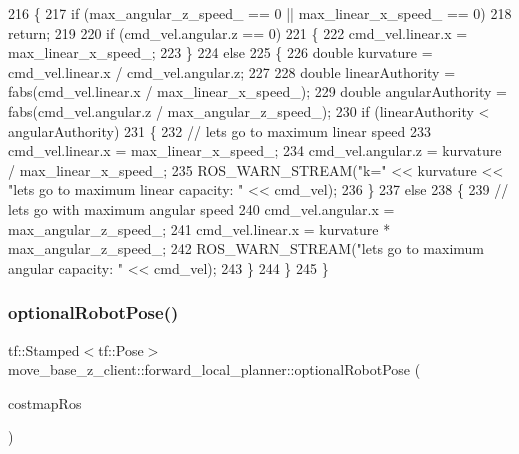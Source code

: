 \begin{DoxyCode}
216 \{
217     \textcolor{keywordflow}{if} (max\_angular\_z\_speed\_ == 0 || max\_linear\_x\_speed\_ == 0)
218         \textcolor{keywordflow}{return};
219 
220     \textcolor{keywordflow}{if} (cmd\_vel.angular.z == 0)
221     \{
222         cmd\_vel.linear.x = max\_linear\_x\_speed\_;
223     \}
224     \textcolor{keywordflow}{else}
225     \{
226         \textcolor{keywordtype}{double} kurvature = cmd\_vel.linear.x / cmd\_vel.angular.z;
227 
228         \textcolor{keywordtype}{double} linearAuthority = fabs(cmd\_vel.linear.x / max\_linear\_x\_speed\_);
229         \textcolor{keywordtype}{double} angularAuthority = fabs(cmd\_vel.angular.z / max\_angular\_z\_speed\_);
230         \textcolor{keywordflow}{if} (linearAuthority < angularAuthority)
231         \{
232             \textcolor{comment}{// lets go to maximum linear speed}
233             cmd\_vel.linear.x = max\_linear\_x\_speed\_;
234             cmd\_vel.angular.z = kurvature / max\_linear\_x\_speed\_;
235             ROS\_WARN\_STREAM(\textcolor{stringliteral}{"k="} << kurvature << \textcolor{stringliteral}{"lets go to maximum linear capacity: "} << cmd\_vel);
236         \}
237         \textcolor{keywordflow}{else}
238         \{
239             \textcolor{comment}{// lets go with maximum angular speed}
240             cmd\_vel.angular.x = max\_angular\_z\_speed\_;
241             cmd\_vel.linear.x = kurvature * max\_angular\_z\_speed\_;
242             ROS\_WARN\_STREAM(\textcolor{stringliteral}{"lets go to maximum angular capacity: "} << cmd\_vel);
243         \}
244     \}
245 \}
\end{DoxyCode}
\mbox{\label{namespacemove__base__z__client_1_1forward__local__planner_a683a39a154ed5aa179fdb1afb7bfe2e4}} 
\subsubsection{\texorpdfstring{optional\+Robot\+Pose()}{optionalRobotPose()}}
{\footnotesize\ttfamily tf\+::\+Stamped$<$tf\+::\+Pose$>$ move\+\_\+base\+\_\+z\+\_\+client\+::forward\+\_\+local\+\_\+planner\+::optional\+Robot\+Pose (\begin{DoxyParamCaption}\item[{costmap\+\_\+2d\+::\+Costmap2\+D\+R\+OS $\ast$}]{costmap\+Ros }\end{DoxyParamCaption})}



